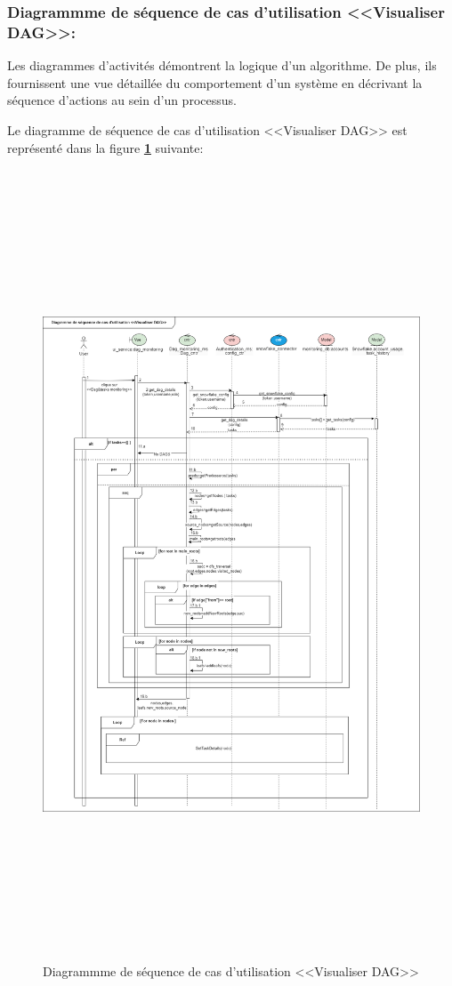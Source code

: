 \subsubsection{Diagrammme de séquence de cas d'utilisation <<Visualiser DAG>>:}
\par Les diagrammes d'activités démontrent la logique d'un algorithme. De plus, ils fournissent une vue détaillée du comportement d'un système en décrivant la séquence d'actions au sein d'un processus\cite{diag_act}.
\par Le diagramme de séquence de cas d'utilisation <<Visualiser DAG>> est représenté dans la figure \textbf{\ref{fig:seq1}} suivante:
    \begin{figure}[H]
        \centering
        \includegraphics[width =1\linewidth, height=23.5cm]{img/conception/seq1.png}
        \caption{Diagrammme de séquence de cas d'utilisation <<Visualiser DAG>> }
            \label{fig:seq1}
    \end{figure}
